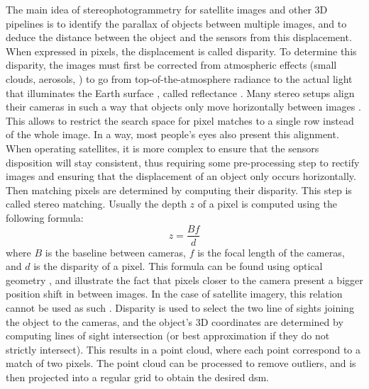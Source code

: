 The main idea of stereophotogrammetry for satellite images and other 3D pipelines is to identify the parallax of objects between multiple images, and to deduce the distance between the object and the sensors from this displacement. When expressed in pixels, the displacement is called disparity. To determine this disparity, the images must first be corrected from atmospheric effects (small clouds, aerosols, \etc) to go from top-of-the-atmosphere radiance to the actual light that illuminates the Earth surface \cite{hagolle_maja_2017}, called reflectance . Many stereo setups align their cameras in such a way that objects only move horizontally between images \cite{geiger_are_2012, scharstein_high-resolution_2014, keselman_intel_2017}. This allows to restrict the search space for pixel matches to a single row instead of the whole image. In a way, most people's eyes also present this alignment. When operating satellites, it is more complex to ensure that the sensors disposition will stay consistent, thus requiring some pre-processing step to rectify images and ensuring that the displacement of an object only occurs horizontally. Then matching pixels are determined by computing their disparity. This step is called stereo matching. Usually the depth $z$ of a pixel is computed using the following formula:
\begin{equation}
    z=\frac{Bf}{d}
\end{equation}
where $B$ is the baseline between cameras, $f$ is the focal length of the cameras, and $d$ is the disparity of a pixel. This formula can be found using optical geometry \cite{bolles_epipolar-plane_1987}, and illustrate the fact that pixels closer to the camera present a bigger position shift in between images. In the case of satellite imagery, this relation cannot be used as such . Disparity is used to select the two line of sights joining the object to the cameras, and the object's 3D coordinates are determined by computing lines of sight intersection (or best approximation if they do not strictly intersect). This results in a point cloud, where each point correspond to a match of two pixels. The point cloud can be processed to remove outliers, and is then projected into a regular grid to obtain the desired \acrshort{dsm}.

